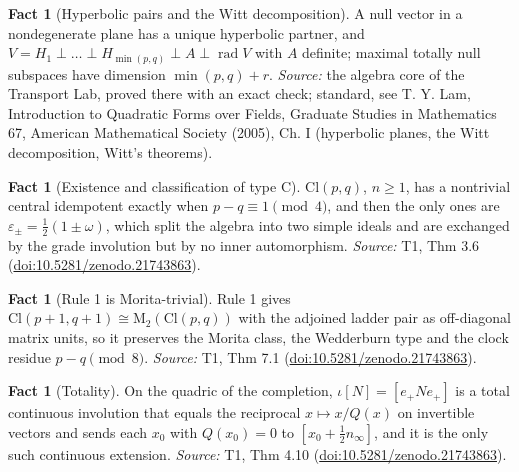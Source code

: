 \documentclass[11pt]{article}
\theoremstyle{definition}
\newtheorem{fact}[theorem]{Fact}
\theoremstyle{plain}
\newcommand{\changedmark}[2]{\marginpar{\raggedright\scriptsize\color{#1}#2}}
\providecommand{\Cl}{}\renewcommand{\Cl}{\mathrm{Cl}}
\providecommand{\Mat}{}\renewcommand{\Mat}{\mathrm{M}}
\providecommand{\nInf}{}\renewcommand{\nInf}{n_\infty}
\begin{document}
\begin{fact}[Hyperbolic pairs and the Witt decomposition]\label{c:std-algebra.witt-decomposition}
A null vector in a nondegenerate plane has a unique hyperbolic partner, and $V = H_1 \perp \dots \perp H_{\min(p,q)} \perp A \perp \operatorname{rad} V$ with $A$ definite; maximal totally null subspaces have dimension $\min(p,q) + r$.
\emph{Source:} the algebra core of the Transport Lab, proved there with an exact check; standard, see T. Y. Lam, Introduction to Quadratic Forms over Fields, Graduate Studies in Mathematics 67, American Mathematical Society (2005), Ch. I (hyperbolic planes, the Witt decomposition, Witt's theorems).
\end{fact}

\begin{fact}[Existence and classification of type C]\label{c:transport.existence-classification-type-c}
$\Cl(p,q)$, $n \geq 1$, has a nontrivial central idempotent exactly when $p - q \equiv 1 \pmod 4$, and then the only ones are $\varepsilon_\pm = \tfrac12(1 \pm \omega)$, which split the algebra into two simple ideals and are exchanged by the grade involution but by no inner automorphism.
\emph{Source:} T1, Thm 3.6 (\href{https://doi.org/10.5281/zenodo.21743863}{doi:10.5281/zenodo.21743863}).
\end{fact}

\begin{fact}[Rule 1 is Morita-trivial]\label{c:transport.rule-1-morita-trivial}
\changedmark{gray}{reworded}
Rule 1 gives $\Cl(p+1, q+1) \cong \Mat_2(\Cl(p,q))$ with the adjoined ladder pair as off-diagonal matrix units, so it preserves the Morita class, the Wedderburn type and the clock residue $p - q \pmod 8$.
\emph{Source:} T1, Thm 7.1 (\href{https://doi.org/10.5281/zenodo.21743863}{doi:10.5281/zenodo.21743863}).
\end{fact}

\begin{fact}[Totality]\label{c:transport.totality}
On the quadric of the completion, $\iota[N] = [e_+ N e_+]$ is a total continuous involution that equals the reciprocal $x \mapsto x/Q(x)$ on invertible vectors and sends each $x_0$ with $Q(x_0) = 0$ to $[x_0 + \frac12 \nInf]$, and it is the only such continuous extension.
\emph{Source:} T1, Thm 4.10 (\href{https://doi.org/10.5281/zenodo.21743863}{doi:10.5281/zenodo.21743863}).
\end{fact}
\end{document}
